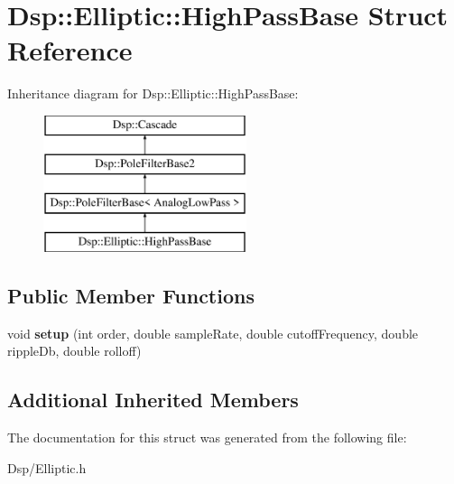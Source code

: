 \hypertarget{structDsp_1_1Elliptic_1_1HighPassBase}{\section{Dsp\-:\-:Elliptic\-:\-:High\-Pass\-Base Struct Reference}
\label{structDsp_1_1Elliptic_1_1HighPassBase}
}
Inheritance diagram for Dsp\-:\-:Elliptic\-:\-:High\-Pass\-Base\-:\begin{figure}[H]
\begin{center}
\leavevmode
\includegraphics[height=4.000000cm]{structDsp_1_1Elliptic_1_1HighPassBase}
\end{center}
\end{figure}
\subsection*{Public Member Functions}
\begin{DoxyCompactItemize}
\item 
\hypertarget{structDsp_1_1Elliptic_1_1HighPassBase_aac35dc27bc7482a4aa6890d2d6c06f24}{void {\bfseries setup} (int order, double sample\-Rate, double cutoff\-Frequency, double ripple\-Db, double rolloff)}\label{structDsp_1_1Elliptic_1_1HighPassBase_aac35dc27bc7482a4aa6890d2d6c06f24}

\end{DoxyCompactItemize}
\subsection*{Additional Inherited Members}


The documentation for this struct was generated from the following file\-:\begin{DoxyCompactItemize}
\item 
Dsp/Elliptic.\-h\end{DoxyCompactItemize}
